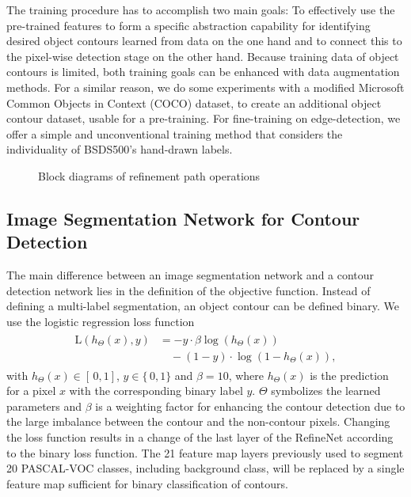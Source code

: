 \documentclass[runningheads]{llncs}
\begin{document}
The training procedure has to accomplish two main goals: To effectively use the pre-trained features to form a specific abstraction capability for identifying desired object contours learned from data on the one hand and to connect this to the pixel-wise detection stage on the other hand. Because training data of object contours is limited, both training goals can be enhanced with data augmentation methods. For a similar reason, we do some experiments with a modified Microsoft Common Objects in Context (COCO) \cite{coco} dataset, to create an additional object contour dataset, usable for a pre-training. For fine-training on edge-detection, we offer a simple and unconventional training method that considers the individuality of BSDS500's hand-drawn labels.
\begin{figure}[]
\centering
{} \quad
   \quad
   \quad
  \caption{Block diagrams of refinement path operations\label{fig:blocks}}
\end{figure}
\subsection{Image Segmentation Network for Contour Detection}
The main difference between an image segmentation network and a contour detection network lies in the definition of the objective function. Instead of defining a multi-label segmentation, an object contour can be defined binary. We use the logistic regression loss function
\begin{align}
\begin{split}
		\textrm{L}(h_\Theta(x), y) & = -y \cdot \beta\log(h_\Theta(x)) \\
		& \quad - (1-y) \cdot \log(1-h_\Theta(x)),
			\end{split} 
			\label{eq:LL2}  
\end{align}
with $h_\Theta(x) \in [ \, 0, 1]$, $y \in \{ \, 0, 1\}$ and $\beta = 10$, where $h_\Theta(x)$ is the prediction for a pixel $x$ with the corresponding binary label $y$.  $\Theta$ symbolizes the learned parameters and $\beta$ is a weighting factor for enhancing the contour detection due to the large imbalance between the contour and the non-contour pixels. Changing the loss function results in a change of the last layer of the RefineNet according to the binary loss function. The 21 feature map layers previously used to segment 20 PASCAL-VOC classes, including background class, will be replaced by a single feature map sufficient for binary classification of contours.
\end{document}

